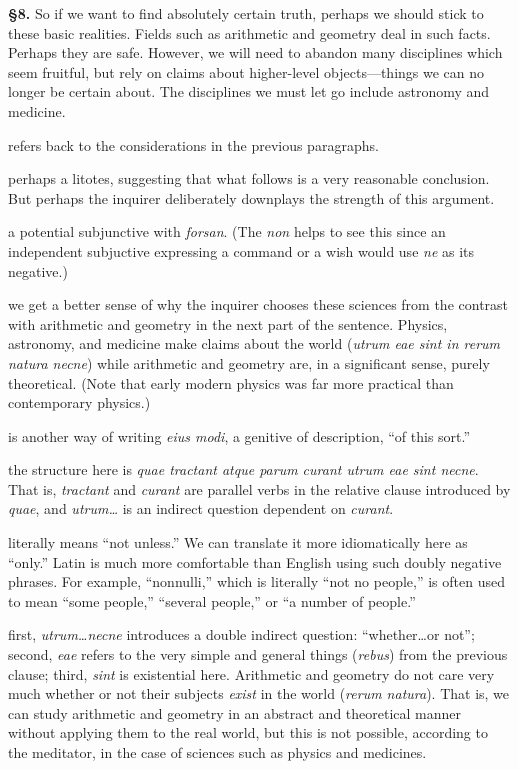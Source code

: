 \prenotes

\textbf{§8.} So if we want to find absolutely certain truth, perhaps we should stick to these basic realities. Fields such as arithmetic and geometry deal in such facts. Perhaps they are safe. However, we will need to abandon many disciplines which seem fruitful, but rely on claims about higher-level objects---things we can no longer be certain about. The disciplines we must let go include astronomy and medicine.

 refers back to the considerations in the previous paragraphs.

 perhaps a litotes, suggesting that what follows is a very reasonable conclusion. But perhaps the inquirer deliberately downplays the strength of this argument.

 a potential subjunctive with \textit{forsan}. (The \textit{non} helps to see this since an independent subjuctive expressing a command or a wish would use \textit{ne} as its negative.)

 we get a better sense of why the inquirer chooses these sciences from the contrast with arithmetic and geometry in the next part of the sentence. Physics, astronomy, and medicine make claims about the world (\textit{utrum eae sint in rerum natura necne}) while arithmetic and geometry are, in a significant sense, purely theoretical. (Note that early modern physics was far more practical than contemporary physics.)

 is another way of writing \textit{eius modi}, a genitive of description, ``of this sort.''

 the structure here is \textit{quae tractant atque parum curant utrum eae sint necne}. That is, \textit{tractant} and \textit{curant} are parallel verbs in the relative clause introduced by \textit{quae}, and \textit{utrum\dots} is an indirect question dependent on \textit{curant}.

 literally means ``not unless.'' We can translate it more idiomatically here as ``only.'' Latin is much more comfortable than English using such doubly negative phrases. For example, ``nonnulli,'' which is literally ``not no people,'' is often used to mean ``some people,'' ``several people,'' or ``a number of people.''

 first, \textit{utrum\dots necne} introduces a double indirect question: ``whether\dots or not''; second, \textit{eae} refers to the very simple and general things (\textit{rebus}) from the previous clause; third, \textit{sint} is existential here. Arithmetic and geometry do not care very much whether or not their subjects \textit{exist} in the world (\textit{rerum natura}). That is, we can study arithmetic and geometry in an abstract and theoretical manner without applying them to the real world, but this is not possible, according to the meditator, in the case of sciences such as physics and medicines.

